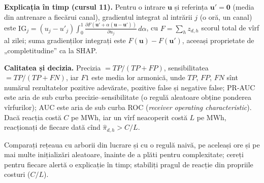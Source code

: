 {\textbf{Explicația în timp (cursul 11).} Pentru o intrare $\mathbf u$ și referința $\mathbf u'=\mathbf 0$ (media din antrenare a fiecărui canal), gradientul integrat al intrării $j$ (o oră, un canal) este
$\mathrm{IG}_j=(u_j-u'_j)\int_0^1\frac{\partial F(\mathbf u'+\alpha(\mathbf u-\mathbf u'))}{\partial u_j}\,d\alpha$, cu $F=\sum_h z_{d,h}$ scorul total de vîrf al zilei; suma gradienților integrați este $F(\mathbf u)-F(\mathbf u')$, aceeași proprietate de „completitudine” ca la SHAP.

\textbf{Calitatea și decizia.} Precizia $=TP/(TP+FP)$, sensibilitatea $=TP/(TP+FN)$, iar $F1$ este media lor armonică, unde $TP$, $FP$, $FN$ sînt numărul rezultatelor pozitive adevărate, pozitive false și negative false; PR-AUC este aria de sub curba precizie--sensibilitate (o regulă aleatoare obține ponderea vîrfurilor); AUC este aria de sub curba ROC (\emph{receiver operating characteristic}).
Dacă reacția costă $C$ pe MWh, iar un vîrf neacoperit costă $L$ pe MWh, reacționați de fiecare dată cînd $\hat\pi_{d,h}>C/L$.}
\begin{decision}
%
{Comparați rețeaua cu arborii din lucrare și cu o regulă naivă, pe aceleași ore și pe mai multe inițializări aleatoare, înainte de a plăti pentru complexitate; cereți pentru fiecare alertă o explicație în timp; stabiliți pragul de reacție din propriile costuri ($C/L$).}
\end{decision}


